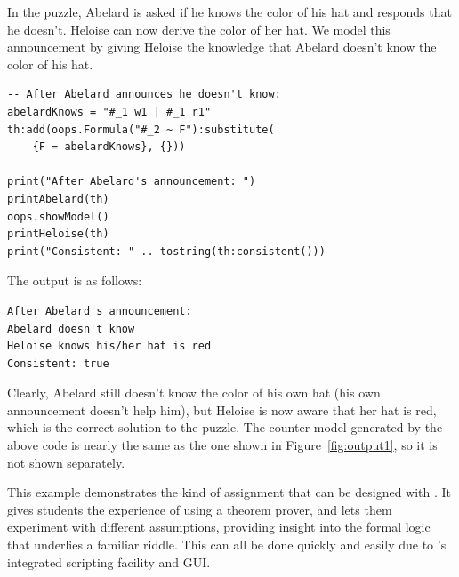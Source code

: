 In the puzzle, Abelard is asked if he knows the color of his hat and responds that he doesn't. Heloise can now derive the color of her hat. We model this announcement by giving Heloise the knowledge that Abelard doesn't know the color of his hat.
\begin{lstlisting}
-- After Abelard announces he doesn't know:
abelardKnows = "#_1 w1 | #_1 r1"
th:add(oops.Formula("#_2 ~ F"):substitute(
    {F = abelardKnows}, {}))

print("After Abelard's announcement: ")
printAbelard(th)
oops.showModel()
printHeloise(th)
print("Consistent: " .. tostring(th:consistent()))
\end{lstlisting}
The output is as follows:
\lstset{language=}
\begin{lstlisting}
After Abelard's announcement:
Abelard doesn't know
Heloise knows his/her hat is red
Consistent: true
\end{lstlisting}
\lstset{language=lua}
Clearly, Abelard still doesn't know the color of his own hat (his own announcement doesn't help him), but Heloise is now aware that her hat is red, which is the correct solution to the puzzle.
The counter-model generated by the above code is nearly the same as the one shown in Figure~\ref{fig:output1}, so it is not shown separately.

This example demonstrates the kind of assignment that can be designed with  \oops\/.
It gives students the experience of using a theorem prover, and lets them experiment with different assumptions, providing insight into the formal logic that underlies a familiar riddle.
This can all be done quickly and easily due to \oops's integrated scripting facility and GUI.
